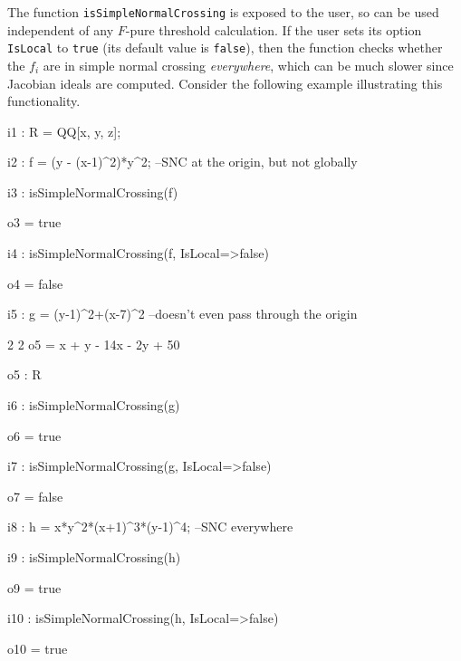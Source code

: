 \documentclass{amsart}
\begin{document}
The function {\tt isSimpleNormalCrossing} is exposed to the user, so can be used independent of any $F$-pure threshold calculation.
If the user sets its option {\tt IsLocal} to {\tt true} (its default value is {\tt false}), then the function checks whether the $f_i$ are in simple normal crossing \emph{everywhere}, which can be much slower since Jacobian ideals are computed. Consider the following example illustrating this functionality.

\medspace
{\small
{}
\begin{MyVerbatim}

i1 : R = QQ[x, y, z];

i2 : f = (y - (x-1)^2)*y^2; --SNC at the origin, but not globally

i3 : isSimpleNormalCrossing(f)

o3 = true

i4 : isSimpleNormalCrossing(f, IsLocal=>false)

o4 = false

i5 : g = (y-1)^2+(x-7)^2 --doesn't even pass through the origin

       2    2
o5 = x  + y  - 14x - 2y + 50

o5 : R

i6 : isSimpleNormalCrossing(g)

o6 = true

i7 : isSimpleNormalCrossing(g, IsLocal=>false)

o7 = false

i8 : h = x*y^2*(x+1)^3*(y-1)^4; --SNC everywhere

i9 : isSimpleNormalCrossing(h)

o9 = true

i10 : isSimpleNormalCrossing(h, IsLocal=>false)

o10 = true
\end{MyVerbatim}
}
\medspace








\end{document}
